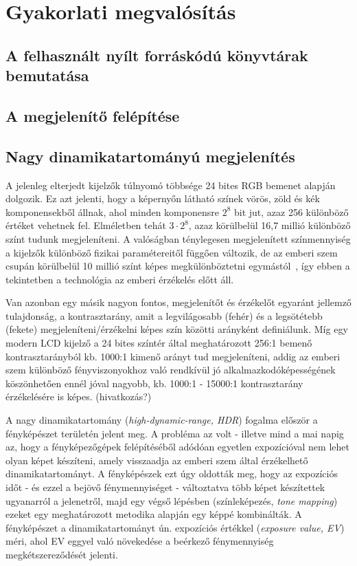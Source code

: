 \documentclass[12pt,oneside]{book}
\begin{document}
\section{Gyakorlati megvalósítás}
\subsection{A felhasznált nyílt forráskódú könyvtárak bemutatása}
\subsection{A megjelenítő felépítése}

\subsection{Nagy dinamikatartományú megjelenítés}

A jelenleg elterjedt kijelzők túlnyomó többsége 24 bites RGB bemenet alapján dolgozik. Ez azt jelenti, hogy a képernyőn látható színek vörös, zöld és kék komponensekből állnak, ahol minden komponensre \(2^8\) bit jut, azaz 256 különböző értéket vehetnek fel. Elméletben tehát \(3 \cdot 2^8\), azaz körülbelül 16,7 millió különböző színt tudunk megjeleníteni. A valóságban ténylegesen megjelenített színmennyiség a kijelzők különböző fizikai paramétereitől függően változik, de az emberi szem csupán körülbelül 10 millió színt képes megkülönböztetni egymástól~\cite{judd1975color}, így ebben a tekintetben a technológia az emberi érzékelés előtt áll.

Van azonban egy másik nagyon fontos, megjelenítőt és érzékelőt egyaránt jellemző tulajdonság, a kontrasztarány, amit a legvilágosabb (fehér) és a legsötétebb (fekete) megjeleníteni/érzékelni képes szín közötti arányként definiálunk. Míg egy modern LCD kijelző a 24 bites színtér által meghatározott 256:1 bemenő kontrasztarányból kb. 1000:1 kimenő arányt tud megjeleníteni, addig az emberi szem különböző fényviszonyokhoz való rendkívül jó alkalmazkodóképességének köszönhetően ennél jóval nagyobb, kb. 1000:1 - 15000:1 kontrasztarány érzékelésére is képes. (hivatkozás?)

A nagy dinamikatartomány (\textit{high-dynamic-range, HDR}) fogalma először a fényképészet területén jelent meg. A probléma az volt - illetve mind a mai napig az, hogy a fényképezőgépek felépítéséből adódóan egyetlen expozícióval nem lehet olyan képet készíteni, amely visszaadja az emberi szem által érzékelhető dinamikatartományt. A fényképészek ezt úgy oldották meg, hogy az expozíciós időt - és ezzel a bejövő fénymennyiséget - változtatva több képet készítettek ugyanarról a jelenetről, majd egy végső lépésben (színleképezés, \textit{tone mapping}) ezeket egy meghatározott metodika alapján egy képpé kombinálták. A fényképészet a dinamikatartományt ún. expozíciós értékkel (\textit{exposure value, EV}) méri, ahol EV eggyel való növekedése a beérkező fénymennyiség megkétszereződését jelenti.
\end{document}
